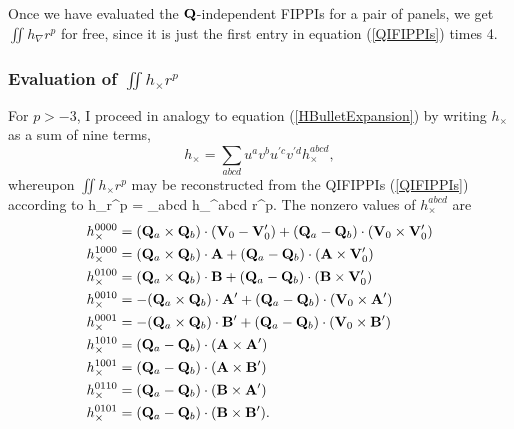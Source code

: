\documentclass[letterpaper]{article}
\begin{document}
Once we have evaluated the $\mathbf{Q}$-independent FIPPIs
for a pair of panels, we get $\iint h_\nabla r^p$ for 
free, since it is just the first entry in 
equation (\ref{QIFIPPIs}) times 4.

\subsubsection*{Evaluation of $\iint h_\times r^p$}

For $p>-3$, I proceed in analogy to equation (\ref{HBulletExpansion})
by writing $h_\times$ as a sum of nine terms,
$$ h_\times 
   = 
   \sum_{abcd} u^a v^b u^{\prime c} v^{\prime d} h_\times^{abcd},
$$
whereupon $\iint h_\times r^p$ may be reconstructed from 
the QIFIPPIs (\ref{QIFIPPIs}) according to
{
 \iint h_\times r^p 
   = 
   \sum_{abcd} h_\times^{abcd} 
               \iint {} r^p.
}
The nonzero values of $h_\times^{abcd}$ are
\begin{align*} 
h_\times^{0000} 
&=  (\mathbf{Q}_a\times \mathbf{Q}_b) \cdot (\mathbf{V}_0 - \mathbf{V}_0^\prime)
   +(\mathbf{Q}_a   -   \mathbf{Q}_b) \cdot (\mathbf{V}_0 \times\mathbf{V}_0^\prime) 
\\ 
h_\times^{1000} 
&=   (\mathbf{Q}_a\times \mathbf{Q}_b) \cdot \mathbf{A} 
   + (\mathbf{Q}_a   -   \mathbf{Q}_b) \cdot (\mathbf{A} \times \mathbf{V}_0^\prime) 
\\
h_\times^{0100} 
&= 
   (\mathbf{Q}_a\times \mathbf{Q}_b) \cdot \mathbf{B} 
  +(\mathbf{Q}_a   -   \mathbf{Q}_b) \cdot (\mathbf{B} \times \mathbf{V}_0^\prime) 
\\ 
h_\times^{0010} 
&= -(\mathbf{Q}_a\times \mathbf{Q}_b) \cdot \mathbf{A}^\prime 
   +(\mathbf{Q}_a   -   \mathbf{Q}_b) \cdot (\mathbf{V}_0 \times \mathbf{A}^\prime) 
\\ 
h_\times^{0001} 
&=  -(\mathbf{Q}_a\times \mathbf{Q}_b) \cdot \mathbf{B}^\prime 
    +(\mathbf{Q}_a   -   \mathbf{Q}_b) \cdot (\mathbf{V}_0 \times \mathbf{B}^\prime) 
\\ 
h_\times^{1010} 
&=   (\mathbf{Q}_a   -   \mathbf{Q}_b) \cdot (\mathbf{A} \times \mathbf{A}^\prime)
\\
h_\times^{1001}
&=   (\mathbf{Q}_a   -   \mathbf{Q}_b) \cdot (\mathbf{A} \times \mathbf{B}^\prime)
\\
 h_\times^{0110}
&=   (\mathbf{Q}_a   -   \mathbf{Q}_b) \cdot (\mathbf{B} \times \mathbf{A}^\prime)
\\
 h_\times^{0101}
&=   (\mathbf{Q}_a   -   \mathbf{Q}_b) \cdot (\mathbf{B} \times \mathbf{B}^\prime).
\end{align*}
\end{document}
